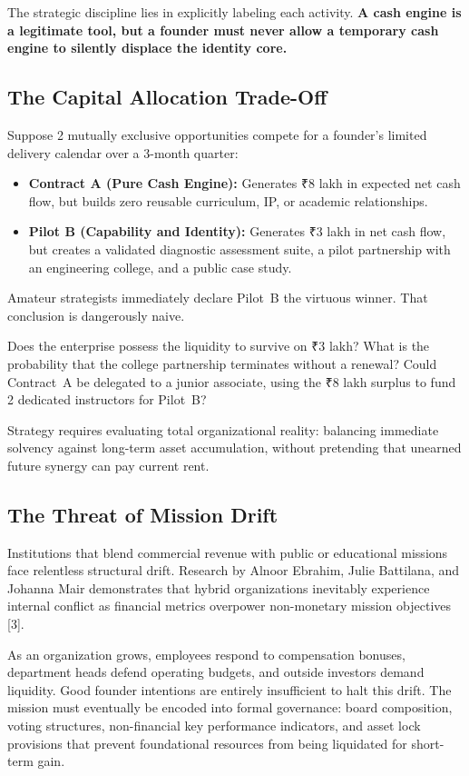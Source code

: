 The strategic discipline lies in explicitly labeling each activity. \textbf{A cash engine is a legitimate tool, but a founder must never allow a temporary cash engine to silently displace the identity core.}

\subsection{The Capital Allocation Trade-Off}

Suppose 2 mutually exclusive opportunities compete for a founder's limited delivery calendar over a 3-month quarter:

\begin{itemize}[leftmargin=11pt,itemsep=2pt,topsep=1.5pt,parsep=0pt]
  \item \textbf{Contract A (Pure Cash Engine):} Generates ₹8 lakh in expected net cash flow, but builds zero reusable curriculum, IP, or academic relationships.
  \item \textbf{Pilot B (Capability and Identity):} Generates ₹3 lakh in net cash flow, but creates a validated diagnostic assessment suite, a pilot partnership with an engineering college, and a public case study.
\end{itemize}

Amateur strategists immediately declare Pilot~B the virtuous winner. That conclusion is dangerously naive.

Does the enterprise possess the liquidity to survive on ₹3 lakh? What is the probability that the college partnership terminates without a renewal? Could Contract~A be delegated to a junior associate, using the ₹8 lakh surplus to fund 2 dedicated instructors for Pilot~B?

Strategy requires evaluating total organizational reality: balancing immediate solvency against long-term asset accumulation, without pretending that unearned future synergy can pay current rent.

\subsection{The Threat of Mission Drift}

Institutions that blend commercial revenue with public or educational missions face relentless structural drift. Research by Alnoor Ebrahim, Julie Battilana, and Johanna Mair demonstrates that hybrid organizations inevitably experience internal conflict as financial metrics overpower non-monetary mission objectives [3].

As an organization grows, employees respond to compensation bonuses, department heads defend operating budgets, and outside investors demand liquidity. Good founder intentions are entirely insufficient to halt this drift. The mission must eventually be encoded into formal governance: board composition, voting structures, non-financial key performance indicators, and asset lock provisions that prevent foundational resources from being liquidated for short-term gain.
